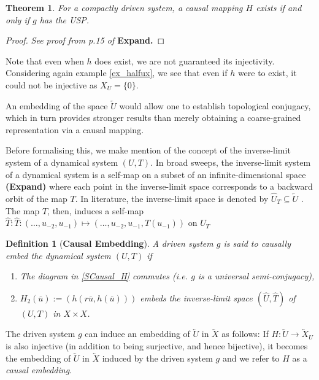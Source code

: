 \documentclass[a4paper,12pt,twoside]{book}
\newtheorem{Definition}{Definition}[]
\newtheorem{Theorem}{Theorem}[]
\begin{document}
\begin{Theorem}
  For a compactly driven system, a causal mapping $H$ exists if and only if $g$ has the USP. 
\end{Theorem}
\begin{proof}
  \emph{See proof from p.15 of \cite{manjunath2021universal}}
  \textbf{Expand.}
\end{proof}

Note that even when $h$ does exist, we are not guaranteed its injectivity. Considering again example \ref{ex_halfux}, we see that even if $h$ were to exist, it could not be injective as $X_U=\{0\}$. 

An embedding of the space $\overleftarrow{U}$   would allow one to establish topological conjugacy, which in turn provides stronger results than merely obtaining a coarse-grained representation via a causal mapping. 


  Before formalising this, we make mention of the concept of the inverse-limit system of a dynamical system $(U,T)$. 
  In broad sweeps, the inverse-limit system of a dynamical system is a self-map on a subset of an infinite-dimensional space \textbf{(Expand)} where each point in the inverse-limit space corresponds to a backward orbit of the map $T$. In literature, the inverse-limit space is denoted by $\hat{U}_T\subseteq\overleftarrow{U}$ \cite{manjunath2021universal}. 
  The map $T$, then, induces a self-map $\hat{T}:\widehat{T}: (\ldots,u_{-2},u_{-1}) \mapsto  (\ldots,u_{-2},u_{-1},T(u_{-1}))$ on $\widehat{U}_T$

\begin{Definition}
  [\bf Causal Embedding]\label{Dfn_CausalEmbed}
  A driven system $g$ is said to causally embed the dynamical system $(U,T)$ if 
  \vspace{-8mm}
\begin{enumerate}[noitemsep, label=\roman*.]
  \item The diagram in \ref{SCausal_H} commutes (i.e. $g$ is a universal semi-conjugacy),
  \item $H_2(\overline{u}):=(h(r\overline{u}, h(\overline{u})))$ embeds the inverse-limit space $(\hat{U}, \hat{T})$ of $(U,T)$ in $X\times{X}$.
\end{enumerate}
\end{Definition}

The driven system $g$ can induce an embedding of $\overleftarrow{U}$ in $\overleftarrow{X}$ as follows: If $H:\overleftarrow{U}\to\overleftarrow{X}_U$ is also injective (in addition to being surjective, and hence bijective), it becomes the embedding of $\overleftarrow{U}$ in $\overleftarrow{X}$ induced by the driven system $g$ and we refer to $H$ as a \emph{causal embedding}. 
\end{document}
